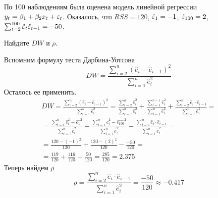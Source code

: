 \begin{problem}
По 100 наблюдениям была оценена модель линейной регрессии $y_t=\beta_1+\beta_2 x_t+\varepsilon_t$. 
Оказалось, что $RSS=120$, $\hat{\varepsilon}_1=-1$, $\hat{\varepsilon}_{100}=2$, $\sum_{t=2}^{100} \hat{\varepsilon}_t\hat{\varepsilon}_{t-1}=-50$. 

Найдите $DW$ и $\rho$.

\begin{sol}
  Вспомним формулу теста Дарбина-Уотсона
\[
  DW = \frac{\sum_{i = 2}^n (\hat{e}_i - \hat{e}_{i - 1})^2}{\sum_{i = 1}^n \hat{e}_i^2}
\]
Осталось ее применить. 
\begin{align*}
DW = \frac{\sum_{i = 2}^n (\hat{e}_i - \hat{e}_{i - 1})^2}{\sum_{i = 1}^n \hat{e}_i^2} = \frac{\sum_{i = 2}^n \hat{e}_i^2}{\sum_{i = 1}^n \hat{e}_i^2} + \frac{\sum_{i = 1}^{n-1} \hat{e}_i^2}{\sum_{i = 1}^n \hat{e}_i^2}  + \frac{\sum_{i = 2}^n \hat{e}_i \cdot \hat{e}_{i - 1}}{\sum_{i = 1}^n \hat{e}_i^2}=\\ 
= \frac{\sum_{i = 1}^n \hat{e}_i^2 - \hat{e_1}^2}{\sum_{i = 1}^n \hat{e}_i^2} + \frac{\sum_{i = 1}^{n} \hat{e}_i^2 - \hat{e_{100}}^2}{\sum_{i = 1}^n \hat{e}_i^2}  - \frac{\sum_{i = 2}^n \hat{e}_i \cdot \hat{e}_{i - 1}}{\sum_{i = 1}^n \hat{e}_i^2}=\\
=  \frac{120 - (-1)^2}{120} + \frac{120 - (2)^2}{120} - \frac{-50}{120} =\\
= \frac{119}{120} + \frac{116}{120} + \frac{50}{120} = \frac{285}{120} = 2.375
\end{align*}
Теперь найдем $\rho$
\[
  \rho = \frac{\sum_{i = 2}^n \hat{e}_i \cdot \hat{e}_{i - 1}}{\sum_{i = 1}^n \hat{e}_i^2} = \frac{-50}{120} \approx -0.417
\]
\end{sol}
\end{problem}



